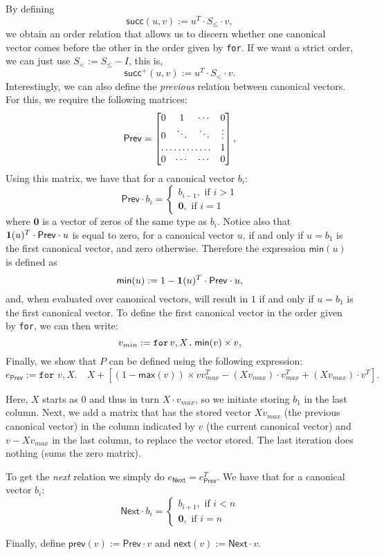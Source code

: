 By defining $$\mathsf{succ}(u,v) := u^T\cdot S_{\leq} \cdot v,$$
we obtain an order relation that allows us to discern whether one canonical vector comes before the other in the order given by \texttt{for}. If we want a strict order, we can just use $S_< := S_{\leq} - I$, this is, $$\mathsf{succ}^+(u,v) := u^T\cdot S_{<} \cdot v.$$
Interestingly, we can also define the \textit{previous} relation between canonical vectors. For this, we require the following matrices:
\[
\mathsf{Prev} = \begin{bmatrix}
    0 & 1 & \cdots &  0 \\
    0 & \ddots & \ddots & \vdots \\
    \hdotsfor{3} & 1 \\
    0 & \cdots & \cdots & 0
\end{bmatrix},
\]
Using this matrix, we have that for a canonical vector $b_i$:
\[
\mathsf{Prev}\cdot b_i=\begin{cases}
               b_{i-1}, \text{ if } i > 1 \\
              \mathbf{0}, \text{ if } i = 1
            \end{cases}
\]
where $\mathbf{0}$ is a vector of zeros of the same type as $b_i$. Notice also that $\mathbf{1}(u)^T\cdot \mathsf{Prev} \cdot u$ is equal to zero, for a canonical vector $u$, if and only if $u = b_1$ is the first canonical vector, and zero otherwise.
Therefore the expression $\mathsf{min}(u)$ is defined as $$\mathsf{min}(u) := 1 - \mathbf{1}(u)^T\cdot \mathsf{Prev} \cdot u,$$ and, when evaluated over canonical vectors, will result in $1$ if and only if $u=b_1$ is the first canonical vector.
To define the first canonical vector in the order given by \texttt{for}, we can then write:
$$v_{min} := \texttt{for}\, v,X \texttt{.}\, \mathsf{min}(v)\times v,$$
Finally, we show that $P$ can be defined using the following \langfor expression:
$$e_{\mathsf{Prev}}:= \texttt{for }v,X.\quad X + \left[ (1 - \mathsf{max}(v))\times vv_{max}^T - (Xv_{max})\cdot v_{max}^T + (Xv_{max})\cdot v^T\right].$$

Here, $X$ starts as 0 and thus in turn $X\cdot v_{max}$, so we initiate storing $b_1$ in the last column. Next, we add a matrix that has the stored vector $Xv_{max}$ (the previous canonical vector) in the column indicated by $v$ (the current canonical vector) and $v-Xv_{max}$ in the last column, to replace the vector stored.
The last iteration does nothing (sums the zero matrix).

To get the \textit{next} relation we simply do $e_{\mathsf{Next}} = e_{\mathsf{Prev}}^T$. We have that for a canonical vector $b_i$:
\[
\mathsf{Next}\cdot b_i=\begin{cases}
               b_{i+1}, \text{ if } i < n \\
              \mathbf{0}, \text{ if } i = n
            \end{cases}
\]

Finally, define $\mathsf{prev}(v):=\mathsf{Prev}\cdot v$ and $\mathsf{next}(v):=\mathsf{Next}\cdot v$.